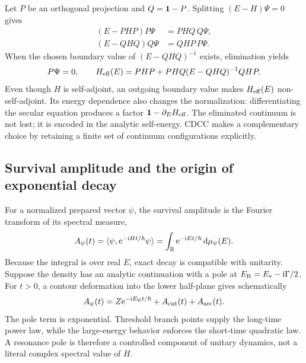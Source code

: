 Let $P$ be an orthogonal projection and $Q=\mathbf{1}-P$.  Splitting
$(E-H)\Psi=0$ gives
\begin{align}
  (E-PHP)P\Psi&=PHQ\,Q\Psi,
  \label{eq:P-projected}\\
  (E-QHQ)Q\Psi&=QHP\,P\Psi.
  \label{eq:Q-projected}
\end{align}
When the chosen boundary value of $(E-QHQ)^{-1}$ exists, elimination yields
\begin{equation}
  [E-\vsub{H}{eff}(E)]P\Psi=0,
  \qquad
  \vsub{H}{eff}(E)
  =PHP+PHQ(E-QHQ)^{-1}QHP.
  \label{eq:feshbach-preview}
\end{equation}
Even though $H$ is self-adjoint, an outgoing boundary value makes
$H_{\mathrm{eff}}(E)$ non-self-adjoint.  Its energy dependence also changes
the normalization: differentiating the secular equation produces a factor
$\mathbf{1}-\partial_EH_{\mathrm{eff}}$.  The eliminated continuum is not
lost; it is encoded in the analytic self-energy.  CDCC makes a complementary
choice by retaining a finite set of continuum configurations explicitly.

\subsection{Survival amplitude and the origin of exponential decay}
\label{subsec:survival-spectral-measure}

For a normalized prepared vector $\psi$, the survival amplitude is the
Fourier transform of its spectral measure,
\begin{equation}
  A_\psi(t)
  =\langle \psi,\mathrm{e}^{-\mathrm{i} Ht/\hbar}\psi\rangle
  =\int_{\mathbb{R}}\mathrm{e}^{-\mathrm{i} Et/\hbar}\,\mathrm{d}\mu_\psi(E).
  \label{eq:survival-spectral-fourier}
\end{equation}
Because the integral is over real $E$, exact decay is compatible with
unitarity.  Suppose the density has an analytic continuation with a pole at
$E_{\mathrm{R}}=E_*-\mathrm{i}\Gamma/2$.  For $t>0$, a contour deformation into the lower
half-plane gives schematically
\begin{equation}
  A_\psi(t)
  =Z\mathrm{e}^{-\mathrm{i} E_{\mathrm{R}} t/\hbar}
   +A_{\mathrm{cut}}(t)+A_{\mathrm{arc}}(t).
  \label{eq:survival-pole-cut}
\end{equation}
The pole term is exponential.  Threshold branch points supply the long-time
power law, while the large-energy behavior enforces the short-time quadratic
law.  A resonance pole is therefore a controlled component of unitary
dynamics, not a literal complex spectral value of $H$.

